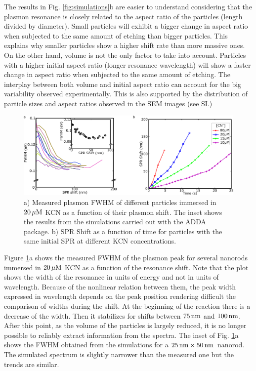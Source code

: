 The results in Fig. \ref{fig:simulations}b are easier to understand
considering that the plasmon resonance is closely related to the aspect ratio of
the particles (length divided by diameter). Small particles will exhibit a
bigger change in aspect ratio when subjected to the same amount of etching than
bigger particles. This explains why smaller particles show a higher shift rate
than more massive ones. On the other hand, volume is not the only factor to take
into account. Particles with a higher initial aspect ratio (longer resonance
wavelength) will show a faster change in aspect ratio when subjected to the same
amount of etching. The interplay between both volume and initial aspect ratio
can account for the big variability observed experimentally. This is also
supported by the distribution of particle sizes and aspect ratios observed in
the SEM images (see SI.)

\begin{figure}[htp]
 \centering
 \includegraphics[width=\textwidth]{Chapters/02_KCN/Figures/03_Shifts/shifts.png}
 \caption{a) Measured plasmon FWHM of different particles immersed in $20\,\mu\textrm{M}$
 KCN as a function of their plasmon shift. The inset shows the results from the
 simulations carried out with the ADDA package. b) SPR Shift as a function of
 time for particles with the same initial SPR at different KCN concentrations.}
 \label{fig:FWHM}
\end{figure}

Figure \ref{fig:FWHM}a shows the measured FWHM of the plasmon peak for several
nanorods immersed in $20\,\mu\textrm{M}$ KCN as a function of the resonance shift. Note that
the plot shows the width of the resonance in units of energy and not in units of
wavelength. Because of the nonlinear relation between them, the peak width
expressed in wavelength depends on the peak position rendering difficult the
comparison of widths during the shift. At the beginning of the reaction there is
a decrease of the width. Then it stabilizes for shifts between $75\,\textrm{nm}$ and
$100\,\textrm{nm}$. After this point, as the volume of the particles is largely reduced,
it is no longer possible to reliably extract information from the spectra. The
inset of Fig. \ref{fig:FWHM}a shows the FWHM obtained from the simulations for
a $25\,\textrm{nm}\times50\,\textrm{nm}$ nanorod. The simulated spectrum is slightly narrower than
the measured one but the trends are similar.

